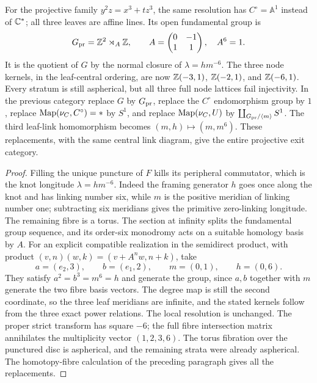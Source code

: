\begin{proposition}\label{P1e-cusp-proper}
For the projective family $y^2z=x^3+tz^3$, the same resolution has
$C^\circ=\mathbb A^1$ instead of $\mathbb C^*$; all three leaves are affine lines.
Its open fundamental group is
\[
 G_{\rm pr}=\mathbb Z^2\rtimes_A\mathbb Z,\qquad
 A=\begin{pmatrix}0&-1\\1&1\end{pmatrix},\quad A^6=1.
\]
It is the quotient of $G$ by the normal closure of
$\lambda=hm^{-6}$. The three node kernels, in the leaf-central
ordering, are now $\mathbb Z(-3,1)$, $\mathbb Z(-2,1)$, and $\mathbb Z(-6,1)$.
Every stratum is still aspherical, but all three full node lattices
fail injectivity. In the previous category replace $G$ by
$G_{\rm pr}$, replace the $C^\circ$ endomorphism group by $1$,
replace $\operatorname{Map}(\nu_C,C^\circ)=*$ by $S^1$, and replace
$\operatorname{Map}(\nu_C,U)$ by $\coprod_{G_{\rm pr}/\langle m\rangle}S^1$.
The third leaf-link homomorphism becomes
$(m,h)\mapsto(m,m^6)$. These replacements, with the same central
link diagram, give the entire projective exit category.
\end{proposition}
\begin{proof}
Filling the unique puncture of $F$ kills its peripheral commutator,
which is the knot longitude $\lambda=hm^{-6}$. Indeed the framing
generator $h$ goes once along the knot and has linking number six,
while $m$ is the positive meridian of linking number one; subtracting
six meridians gives the primitive zero-linking longitude. The remaining
fibre is a torus. The section at infinity splits the fundamental
group sequence, and its order-six monodromy acts on a suitable
homology basis by $A$. For an explicit compatible realization in
the semidirect product, with product
$(v,n)(w,k)=(v+A^nw,n+k)$, take
\[
 a=(e_2,3),\qquad b=(e_1,2),\qquad
 m=(0,1),\qquad h=(0,6).
\]
They satisfy $a^2=b^3=m^6=h$ and generate the group, since $a,b$
together with $m$ generate the two fibre basis vectors. The degree
map is still the second coordinate, so the three leaf meridians
are infinite, and the stated kernels follow from the three exact
power relations. The local resolution is unchanged. The proper
strict transform has square $-6$; the full fibre intersection
matrix annihilates the multiplicity vector $(1,2,3,6)$.
The torus fibration over the punctured disc is aspherical, and
the remaining strata were already aspherical. The homotopy-fibre
calculation of the preceding paragraph gives all the replacements.
\end{proof}

